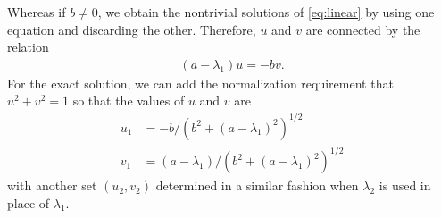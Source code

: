 Whereas if $b\neq 0$, we obtain the nontrivial solutions of \eqref{eq:linear} by using one equation and discarding the other. Therefore, $u$ and $v$ are connected by the relation
%
\begin{align}
	\left(a-\lambda_1\right)u = -bv.
\end{align}
%
For the exact solution, we can add the normalization requirement that $u^2 + v^2 = 1$ so that the values of $u$ and $v$ are 
%
\begin{align}
	u_1 &= -b/\left(b^2 + (a-\lambda_1)^2\right)^{1/2} \nonumber \\
	v_1 &= (a-\lambda_1)/\left(b^2 + (a-\lambda_1)^2\right)^{1/2}
\end{align}
%
with another set $(u_2,v_2)$ determined in a similar fashion when $\lambda_2$ is used in place of $\lambda_1$.
